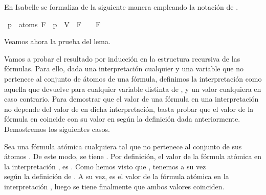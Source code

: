 \begin{isabellebody}
\begin{isamarkuptext}
  En Isabelle se formaliza de la siguiente manera empleando la notación
  de .%
\end{isamarkuptext}\isamarkuptrue%
\isamarkupfalse%
\ {\isachardoublequoteopen}p\ {\isasymnotin}\ atoms\ F\ {\isasymLongrightarrow}\ {\isacharparenleft}{\isasymA}{\isacharparenleft}p\ {\isacharcolon}{\isacharequal}\ V{\isacharparenright}{\isacharparenright}\ {\isasymTurnstile}\ F\ {\isasymlongleftrightarrow}\ {\isasymA}\ {\isasymTurnstile}\ F{\isachardoublequoteclose}\isanewline
%
\isadelimproof
\ \ %
\endisadelimproof
%
\isatagproof
{}\isamarkupfalse%
%
\endisatagproof
{\isafoldproof}%
%
\isadelimproof
%
\endisadelimproof
%
\begin{isamarkuptext}%
Veamos ahora la prueba del lema.

  \begin{demostracion}
  Vamos a probar el resultado por inducción en la estructura recursiva
  de las fórmulas. Para ello, dada una interpretación cualquier \isa{{\isasymA}} y 
  una variable  que no pertenece al conjunto de átomos de una 
  fórmula, definimos la interpretación \isa{{\isasymA}{\isacharprime}} como aquella que devuelve
   para cualquier variable  distinta de , y un valor 
  cualquiera  en caso contrario. Para demostrar que el valor de una 
  fórmula en una interpretación no depende del valor de  en dicha 
  interpretación, basta probar que el valor de la fórmula en \isa{{\isasymA}} 
  coincide con su valor en \isa{{\isasymA}{\isacharprime}} según la definición dada anteriormente. 
  Demostremos los siguientes casos.

  Sea  una fórmula atómica cualquiera tal que  no pertenece
  al conjunto de sus átomos . De este modo, se tiene . 
  Por definición, el valor de la fórmula atómica  en la 
  interpretación \isa{{\isasymA}{\isacharprime}}, es . Como hemos visto que , 
  tenemos a su vez\\  según la definición de \isa{{\isasymA}{\isacharprime}}. A su
  vez,  es el valor de la fórmula atómica  en la 
  interpretación \isa{{\isasymA}}, luego se tiene finalmente que ambos valores
  coinciden. 


\end{demostracion}
\end{isamarkuptext}
\end{isabellebody}
